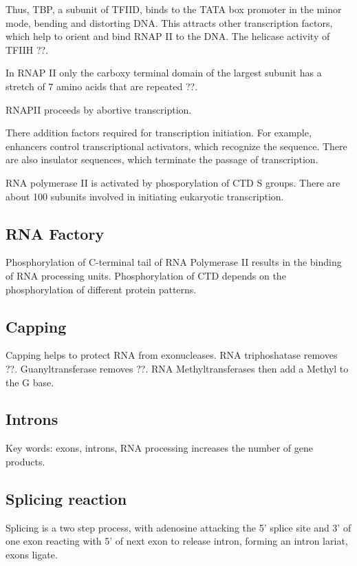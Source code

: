 \documentclass[11pt]{scrartcl}
\begin{document}
Thus, TBP, a subunit of TFIID, binds to the TATA box promoter in the
minor mode, bending and distorting DNA. This attracts other
transcription factors, which help to orient and bind RNAP II to the
DNA. The helicase activity of TFIIH ??.

In RNAP II only the carboxy terminal domain of the largest subunit has
a stretch of 7 amino acids that are repeated ??.

RNAPII proceeds by abortive transcription.

There addition factors required for transcription initiation. For example,  enhancers control transcriptional activators, which recognize the sequence. There are also insulator sequences, which terminate the passage of transcription.

RNA polymerase II is activated by phosporylation of CTD S
groups. There are about 100 subunits involved in initiating eukaryotic
transcription.

\subsection{RNA Factory}

Phosphorylation of C-terminal tail of RNA Polymerase II results in the
binding of RNA processing units. Phosphorylation of CTD depends on the
phosphorylation of different protein patterns.

\subsection{Capping}

Capping helps to protect RNA from exonucleases. RNA triphoshatase
removes ??. Guanyltransferase removes ??. RNA Methyltransferases then
add a Methyl to the G base.
\subsection{Introns}

Key words: exons, introns, 
RNA processing increases the number of gene products. 

\subsection{Splicing reaction}

Splicing is a two step process, with adenosine attacking the 5' splice
site and 3' of one exon reacting with 5' of next exon to release
intron, forming an intron lariat, exons ligate.
\end{document}
